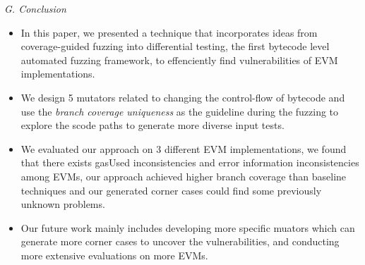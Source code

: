 \documentclass[a4paper]{article}
\begin{document}
	\textit{G. Conclusion}
	\begin{itemize}
		\item In this paper, we presented a technique that incorporates ideas from coverage-guided fuzzing into differential testing, the first bytecode level automated fuzzing framework, to effenciently find vulnerabilities of EVM implementations. 
		\item We design 5 mutators related to changing the control-flow of bytecode and use the \textit{branch coverage uniqueness} as the guideline during the fuzzing to explore the scode paths to generate more diverse input tests.
		\item We evaluated our approach on 3 different 
		EVM implementations, we found that there exists gasUsed inconsistencies and error information inconsistencies among EVMs, our approach achieved higher
		branch coverage than baseline techniques and our generated corner cases could find some previously unknown problems. 
		\item Our future work mainly
		includes developing more specific muators which can generate more corner cases to uncover the vulnerabilities, and conducting more
		extensive evaluations on more EVMs.
	\end{itemize}
\end{document}
